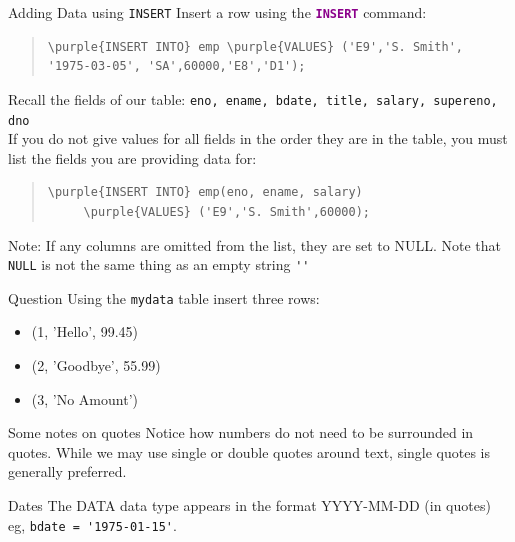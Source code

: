 \documentclass[xcolor=svgnames]{beamer}
\newcommand{\nl}{\\[1em]}
\newcommand{\purple}[1]{{\textcolor{DarkMagenta}{#1}}}
\newcommand{\command}[1]{\texttt{\textbf{\textcolor{DarkMagenta}{#1}}}}
\theoremstyle{example}
\begin{document}
\begin{frame}[fragile]{Adding Data using {\tt INSERT}}
Insert a row using the \command{INSERT} command:
\begin{quote}
\begin{Verbatim}[frame=single, commandchars=\\\{\}]
\purple{INSERT INTO} emp \purple{VALUES} ('E9','S. Smith',
'1975-03-05', 'SA',60000,'E8','D1');
\end{Verbatim}
\end{quote}

Recall the fields of our table:  {\tt eno, ename, bdate, title, salary, supereno, dno}\nl

If you do not give values for all fields in the order they are in the table, you must list the fields you are providing data for:
\begin{quote}
\begin{Verbatim}[frame=single, commandchars=\\\{\}]
\purple{INSERT INTO} emp(eno, ename, salary) 
     \purple{VALUES} ('E9','S. Smith',60000);
\end{Verbatim}
\end{quote}

Note: If any columns are omitted from the list, they are set to NULL. \alert{Note that {\tt NULL} is not the same thing as an empty string} \verb!''!

\end{frame}

\begin{frame}[fragile]
\begin{exampleblock}
{Question} Using the {\tt mydata} table insert three rows: 
\begin{itemize}
\item (1, 'Hello', 99.45)
\item (2, 'Goodbye', 55.99)
\item (3, 'No Amount')
\end{itemize}

\end{exampleblock}

\begin{alertblock}{Some notes on quotes}
Notice how numbers do not need to be surrounded in quotes. While we may use single or double quotes around text, single quotes is generally preferred. 
\end{alertblock}
\begin{alertblock}{Dates}
The DATA data type appears in the format YYYY-MM-DD (in quotes) eg, \verb|bdate = '1975-01-15'|.  
\end{alertblock}
\end{frame}
\end{document}
